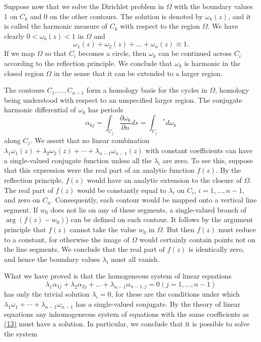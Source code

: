 
Suppose now that we solve the Dirichlet problem in $\Omega$ with the boundary values 1 on $C_{k}$ and 0 on the other contours. The solution is denoted by $\omega_{k}(z)$, and it is called the harmonic measure of $C_{k}$ with respect to the region $\Omega$. We have clearly $0 < \omega_{k}(z) < 1$ in $\Omega$ and
\begin{equation*}
\omega_ {1} (z) + \omega_ {2} (z) + \dots + \omega_ {n} (z) \equiv 1.
\end{equation*}
If we map $\Omega$ so that $C_{i}$ becomes a circle, then $\omega_{k}$ can be continued across $C_{i}$ according to the reflection principle. We conclude that $\omega_{k}$ is harmonic in the closed region $\Omega$ in the sense that it can be extended to a larger region.

The contours $C_{1}, \ldots, C_{n-1}$ form a homology basis for the cycles in $\Omega$, homology being understood with respect to an unspecified larger region. The conjugate harmonic differential of $\omega_{k}$ has periods
\begin{equation*}
\alpha_ {k j} = \int_ {C _ {j}} \frac {\partial \omega_ {k}}{\partial n} d s = \int_ {C _ {j}} {}^{*}d \omega_ {k}
\end{equation*}
along $C_j$. We assert that no linear combination $\lambda_1\omega_1(z) + \lambda_2\omega_2(z) + \cdots + \lambda_{n-1}\omega_{n-1}(z)$ with constant coefficients can have a single-valued conjugate function unless all the $\lambda_i$ are zero. To see this, suppose that this expression were the real part of an analytic function $f(z)$. By the reflection principle, $f(z)$ would have an analytic extension to the closure of $\Omega$. The real part of $f(z)$ would be constantly equal to $\lambda_i$ on $C_i$, $i = 1, \ldots, n - 1$, and zero on $C_n$. Consequently, each contour would be mapped onto a vertical line segment. If $w_0$ does not lie on any of these segments, a single-valued branch of $\arg (f(z) - w_0)$) can be defined on each contour. It follows by the argument principle that $f(z)$ cannot take the value $w_0$ in $\Omega$. But then $f(z)$ must reduce to a constant, for otherwise the image of $\Omega$ would certainly contain points not on the line segments. We conclude that the real part of $f(z)$ is identically zero, and hence the boundary values $\lambda_i$ must all vanish.

What we have proved is that the homogeneous system of linear equations
\begin{equation*}
\lambda_ {1} \alpha_ {1 j} + \lambda_ {2} \alpha_ {2 j} + \dots + \lambda_ {n - 1} \alpha_ {n - 1, j} = 0 (j = 1, \dots , n - 1)\tag{13}\label{eq:6.13}
\end{equation*}
has only the trivial solution $\lambda_{i}=0$, for these are the conditions under which $\lambda_{1}\omega_{1}+\cdots+\lambda_{n-1}\omega_{n-1}$ has a single-valued conjugate. By the theory of linear equations any inhomogeneous system of equations with the same coefficients as \hyperref[eq:6.13]{(13)} must have a solution. In particular, we conclude that it is possible to solve the system


